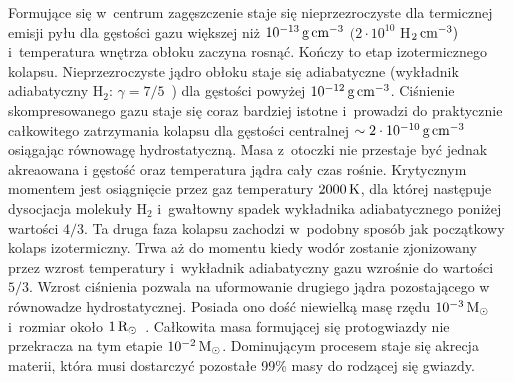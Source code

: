 \par Formujące się w~centrum zagęszczenie staje się nieprzezroczyste dla
termicznej emisji pyłu dla gęstości gazu większej niż $10^{-13}\hbox{$\thinspace\textrm{g}$}\hbox{$\thinspace\textrm{cm}$}^{-3}$
$(2\cdot10^{10}$ H$_2\hbox{$\thinspace\textrm{cm}$}^{-3})$~\cite{L69} i~temperatura wnętrza obłoku zaczyna
rosnąć. Kończy to etap izotermicznego kolapsu. Nieprzezroczyste jądro obłoku
staje się adiabatyczne (wykładnik adiabatyczny H$_2$: $\gamma = 7/5$~\cite{L69})
dla gęstości powyżej $10^{-12}\hbox{$\thinspace\textrm{g}$}\hbox{$\thinspace\textrm{cm}$}^{-3}$. Ciśnienie skompresowanego gazu staje
się coraz bardziej istotne i~prowadzi do praktycznie całkowitego zatrzymania
kolapsu dla gęstości centralnej $\sim 2\cdot 10^{-10}\hbox{$\thinspace\textrm{g}$}\hbox{$\thinspace\textrm{cm}$}^{-3}$ osiągając
równowagę hydrostatyczną. Masa z~otoczki nie przestaje być jednak akreaowana i
gęstość oraz temperatura jądra cały czas rośnie. Krytycznym momentem jest
osiągnięcie przez gaz temperatury $2000\hbox{$\thinspace\textrm{K}$}$, dla której następuje dysocjacja
molekuły H$_2$ i~gwałtowny spadek wykładnika adiabatycznego poniżej wartości
$4/3$. Ta druga faza kolapsu zachodzi w~podobny sposób jak początkowy
kolaps izotermiczny. Trwa aż do momentu kiedy wodór zostanie zjonizowany przez
wzrost temperatury i~wykładnik adiabatyczny gazu wzrośnie do wartości $5/3$.
Wzrost ciśnienia pozwala na uformowanie drugiego jądra pozostającego w
równowadze hydrostatycznej. Posiada ono dość niewielką masę rzędu
$10^{-3}\hbox{$\mathrm{\thinspace M_{\odot}}$}$ i~rozmiar około $1\hbox{$\mathrm{\thinspace R_{\odot}}$}$~\cite{MI00}. Całkowita masa formującej
się protogwiazdy nie przekracza na tym etapie $10^{-2}\hbox{$\mathrm{\thinspace M_{\odot}}$}$. Dominującym
procesem staje się akrecja materii, która musi dostarczyć pozostałe 99\% masy do
rodzącej się gwiazdy. 

